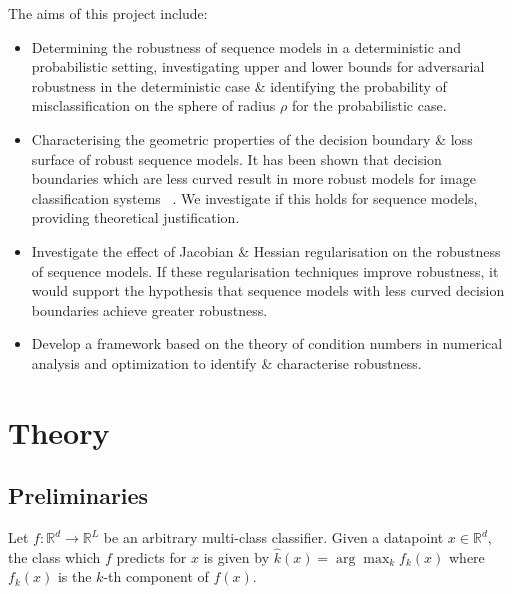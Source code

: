 \documentclass[a4paper,singlecolumn,12pt]{article}
\begin{document}
The aims of this project include:
\begin{itemize}
    \item Determining the robustness of sequence models in a deterministic and probabilistic setting, investigating upper and lower bounds for adversarial robustness in the deterministic case \& identifying the probability of misclassification on the sphere of radius $\rho$ for the probabilistic case.
    
    \item Characterising the geometric properties of the decision boundary \& loss surface of robust sequence models. It has been shown that decision boundaries which are less curved result in more robust models for image classification systems ~\cite{moosavi-dezfooli2018robustness}. We investigate if this holds for sequence models, providing theoretical justification.
    
    \item Investigate the effect of Jacobian \& Hessian regularisation on the robustness of sequence models. If these regularisation techniques improve robustness, it would support the hypothesis that sequence models with less curved decision boundaries achieve greater robustness.
    
    \item Develop a framework based on the theory of condition numbers in numerical analysis and optimization to identify \& characterise robustness. 

\end{itemize}


\section{Theory}
\subsection{Preliminaries}
Let $f: \mathbb{R}^{d} \rightarrow \mathbb{R}^{L}$ be an arbitrary multi-class classifier. Given a datapoint $x \in \mathbb{R}^{d}$, the class which $f$ predicts for $x$ is given by $\hat{k}(x) = \arg \max_{k} f_{k}(x) $ where $f_{k}(x)$ is the $k$-th component of $f(x)$.
\end{document}
